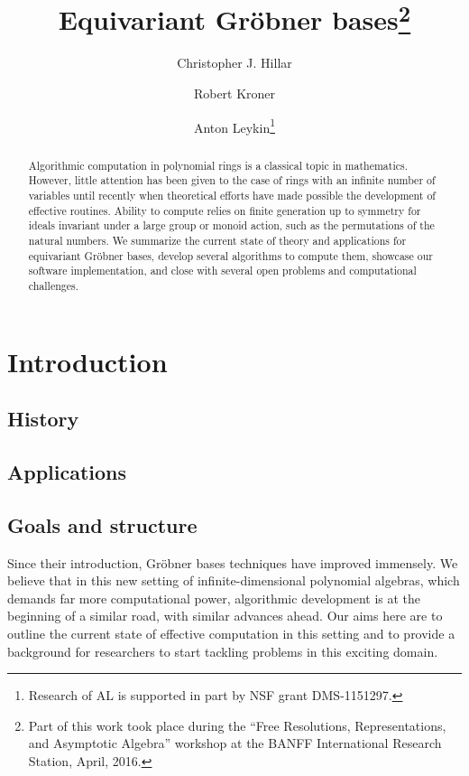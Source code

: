 \documentclass[twoside,leqno]{article}
\title{\Large Equivariant Gr\"obner bases\thanks{Part of this work took place during the ``Free Resolutions, Representations, and Asymptotic Algebra'' workshop at the BANFF International Research Station, April, 2016.}}
\author{Christopher J. Hillar \\
\and
Robert Kroner
\and
Anton Leykin\thanks{Research of AL is supported in part by NSF grant DMS-1151297.}}
\begin{document}
\maketitle 

\begin{abstract}
Algorithmic computation in polynomial rings is a classical topic in mathematics. However, little attention has been given to the case of rings with an infinite number of variables until recently when theoretical efforts have made possible the development of effective routines. Ability to compute relies on finite generation up to symmetry for ideals invariant under a large group or monoid action, such as the permutations of the natural numbers. We summarize the current state of theory and applications for equivariant Gr\"obner bases, develop several algorithms to compute them, showcase our software implementation, and close with several open problems and computational challenges.
\end{abstract}


\section{Introduction}

\subsection{History}



\subsection{Applications}



\subsection{Goals and structure}

Since their introduction, Gr\"obner bases techniques have improved immensely.  We believe that in this new setting of infinite-dimensional polynomial algebras, which demands far more computational power, algorithmic development is at the beginning of a similar road, with similar advances ahead. Our aims here are to outline the current state of effective computation in this setting and to provide a background for researchers to start tackling problems in this exciting  domain. 
\end{document}
